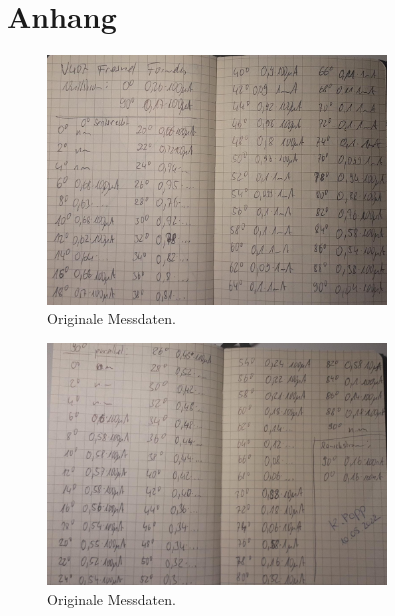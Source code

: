 \section{Anhang}
\label{sec:a}
\begin{figure}[H]
  \centering
  \includegraphics[width=9cm]{a1.png}
  \caption{Originale Messdaten.}
\end{figure}
\begin{figure}[H]
  \centering
  \includegraphics[width=9cm]{a2.png}
  \caption{Originale Messdaten.}
\end{figure}


